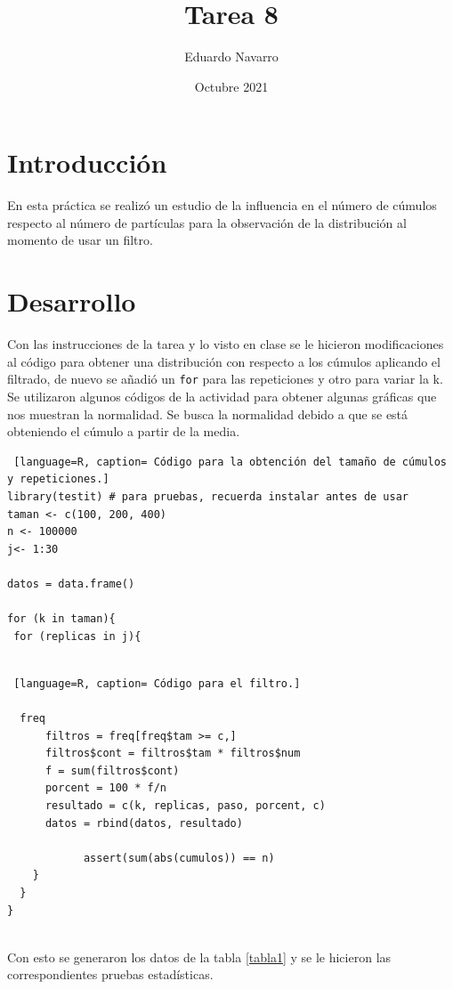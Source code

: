 \documentclass{article}
\title{Tarea 8}
\author{Eduardo Navarro}
\date{Octubre 2021}
\begin{document}
\maketitle

\section{Introducción}

En esta práctica se realizó un estudio de la influencia en el número de cúmulos respecto al número de partículas para la observación de la distribución al momento de usar un filtro.

\section{Desarrollo}
Con las instrucciones de la tarea \cite{urnas} y lo visto en clase \cite{twitchsimu} se le hicieron modificaciones al código para obtener una distribución con respecto a los cúmulos aplicando el filtrado, de nuevo se añadió un \texttt{for} para las repeticiones y otro para variar la k. Se utilizaron algunos códigos de la actividad \cite{urnas} para obtener algunas gráficas que nos muestran la normalidad. Se busca la normalidad debido a que se está obteniendo el cúmulo a partir de la media. 

\begin{lstlisting} [language=R, caption= Código para la obtención del tamaño de cúmulos y repeticiones.]
library(testit) # para pruebas, recuerda instalar antes de usar
taman <- c(100, 200, 400)
n <- 100000
j<- 1:30

datos = data.frame()

for (k in taman){
 for (replicas in j){
 
\end{lstlisting}

\begin{lstlisting} [language=R, caption= Código para el filtro.]
 
  freq
      filtros = freq[freq$tam >= c,]
      filtros$cont = filtros$tam * filtros$num
      f = sum(filtros$cont)
      porcent = 100 * f/n 
      resultado = c(k, replicas, paso, porcent, c)
      datos = rbind(datos, resultado)
      
            assert(sum(abs(cumulos)) == n)
    }  
  }
}
      
\end{lstlisting}

\newpage
 Con esto se generaron los datos de la tabla \ref{tabla1} y se le hicieron las correspondientes pruebas estadísticas.
 
\end{document}
